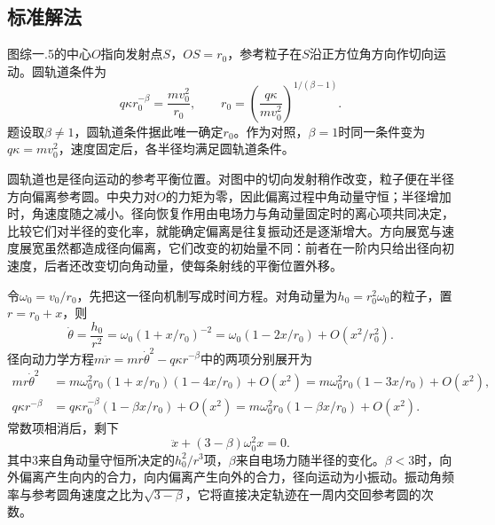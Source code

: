\documentclass[UTF8,fontset=fandol,a4paper,11pt]{ctexart}
\begin{document}


\subsection*{标准解法}


图综一.5的中心$O$指向发射点$S$，$OS=r_0$，参考粒子在$S$沿正方位角方向作切向运动。圆轨道条件为
\[
q\kappa r_0^{-\beta}=\frac{mv_0^2}{r_0},
\qquad
\boxed{r_0=\left(\frac{q\kappa}{mv_0^2}\right)^{1/(\beta-1)}}.
\]
题设取$\beta\ne1$，圆轨道条件据此唯一确定$r_0$。作为对照，$\beta=1$时同一条件变为$q\kappa=mv_0^2$，速度固定后，各半径均满足圆轨道条件。

圆轨道也是径向运动的参考平衡位置。对图中的切向发射稍作改变，粒子便在半径方向偏离参考圆。中央力对$O$的力矩为零，因此偏离过程中角动量守恒；半径增加时，角速度随之减小。径向恢复作用由电场力与角动量固定时的离心项共同决定，比较它们对半径的变化率，就能确定偏离是往复振动还是逐渐增大。方向展宽与速度展宽虽然都造成径向偏离，它们改变的初始量不同：前者在一阶内只给出径向初速度，后者还改变切向角动量，使每条射线的平衡位置外移。

令$\omega_0=v_0/r_0$，先把这一径向机制写成时间方程。对角动量为$h_0=r_0^2\omega_0$的粒子，置$r=r_0+x$，则
\[
\dot\theta=\frac{h_0}{r^2}
=\omega_0(1+x/r_0)^{-2}
=\omega_0(1-2x/r_0)+O(x^2/r_0^2).
\]
径向动力学方程$m\ddot r=mr\dot\theta^2-q\kappa r^{-\beta}$中的两项分别展开为
\[
\begin{aligned}
mr\dot\theta^2&=m\omega_0^2r_0(1+x/r_0)(1-4x/r_0)+O(x^2)
=m\omega_0^2r_0(1-3x/r_0)+O(x^2),\\
q\kappa r^{-\beta}&=q\kappa r_0^{-\beta}(1-\beta x/r_0)+O(x^2)
=m\omega_0^2r_0(1-\beta x/r_0)+O(x^2).
\end{aligned}
\]
常数项相消后，剩下
\[
\ddot x+(3-\beta)\omega_0^2x=0.
\]
其中$3$来自角动量守恒所决定的$h_0^2/r^3$项，$\beta$来自电场力随半径的变化。$\beta<3$时，向外偏离产生向内的合力，向内偏离产生向外的合力，径向运动为小振动。振动角频率与参考圆角速度之比为$\sqrt{3-\beta}$，它将直接决定轨迹在一周内交回参考圆的次数。
\end{document}
